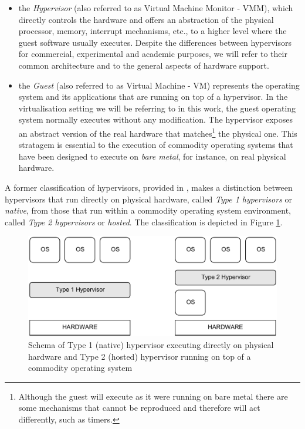 \begin{itemize}
\item the \emph{Hypervisor} (also referred to as Virtual Machine Monitor - VMM), which directly controls the hardware and offers an abstraction of the physical processor, memory, interrupt mechanisms, etc., to a higher level where the guest software usually executes. Despite the differences between hypervisors for commercial, experimental and academic purposes, we will refer to their common architecture and to the general aspects of hardware support. %

\item the \emph{Guest} (also referred to as Virtual Machine - VM) represents the operating system and its applications that are running on top of a hypervisor. In the virtualisation setting we will be referring to in this work, the guest operating system normally executes without any modification. The hypervisor exposes an abstract version of the real hardware that matches\footnote{Although the guest will execute as it were running on bare metal there are some mechanisms that cannot be reproduced and therefore will act differently, such as timers.} the physical one. This stratagem is essential to the execution of commodity operating systems that have been designed to execute on \emph{bare metal}, for instance, on real physical hardware.   
\end{itemize}

A former classification of hypervisors, provided in \cite{popekgoldberg}, makes a distinction between hypervisors that run directly on physical hardware, called \emph{Type 1 hypervisors} or \emph{native}, from those that run within a commodity operating system environment, called \emph{Type 2 hypervisors} or \emph{hosted}. The classification is depicted in Figure \ref{type_hyper}.


\begin{figure}[htbp] 
\begin{center}
\includegraphics[scale=0.6]{images/type_hyper.pdf}
\caption{{Schema of Type 1 (native) hypervisor executing directly on physical hardware and Type 2 (hosted) hypervisor running on top of a commodity operating system}}
\label{type_hyper}
\end{center}
\end{figure}


